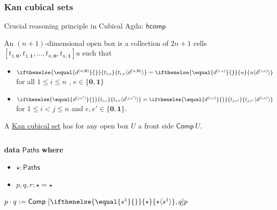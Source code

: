 \documentclass[xetex, mathserif, serif]{beamer}
\newcommand{\mdef}{:=}
\newcommand{\mname}[1]{\underline{{#1}}}
\newcommand{\izero}{{\scriptstyle\mathbf{0}}}
\newcommand{\ione}{{\scriptstyle\mathbf{1}}}
\newcommand{\smap}[1]{s^{{#1}}}
\newcommand{\dmap}[2]{d^{({#1} , {#2})}}
\newcommand{\cont}[2]{ \ifthenelse{\equal{#2}{}}{#1}{{#1}\langle{#2}\rangle} }
\newcommand{\cset}[1]{\ensuremath{\mathsf{{#1}}}}
\newcommand{\comp}[2]{\mathsf{Comp}({#1}\ {#2})}
\newcommand{\pc}{\cdot}
\begin{document}
\begin{frame}
  \frametitle{Kan cubical sets}

  Crucial reasoning principle in Cubical Agda: $\mathsf{hcomp}$

  \begin{block}{}
    An $(n+1)$-dimensional open box is a collection of $2n + 1$ cells
    $[t_{1,\izero}, t_{1,\ione} , \ldots , t_{n,\izero}, t_{n,\ione}]u$ such that
    \begin{itemize}
    \item $\cont{t_{i,e}}{\dmap{n}{\izero}} = \cont{u}{\dmap{i}{e}}$ for all $1
      \leq i \leq n$ , $e \in \{\izero,\ione\}$
    \item $\cont{t_{i,e}}{\dmap{j}{e'}} = \cont{t_{j,e'}}{\dmap{i}{e}}$ for $1 \leq i < j \leq n$ and $e,e′ \in \{\izero,\ione\}$.
    \end{itemize}
  \end{block}

  \begin{block}{}
    A \mname{Kan cubical set} has for any open box $U$ a front side $\mathsf{Comp}\ U$.
  \end{block}

  \begin{exampleblock}{}
    \begin{columns}
      \begin{column}{.6\textwidth}
        \textbf{data} \cset{Paths} \textbf{where}
        \begin{itemize}
        \item $\cset{\star} : \cset{Paths}$
        \item $p,q,r : \star = \star$
        \end{itemize}

        $p \pc q \mdef \mathsf{Comp}\ [\cont{\cset{\star}}{\smap{1}} , q ]p $
      \end{column}
      \begin{column}{.3\textwidth}
      \end{column}
    \end{columns}

\end{exampleblock}

\end{frame}
\end{document}
